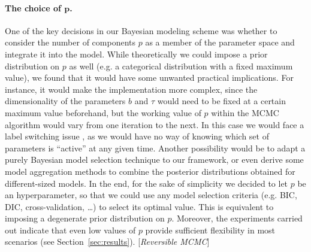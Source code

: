 \documentclass[ba]{imsart}
\numberwithin{equation}{section}
\theoremstyle{plain}
\newcommand\incomment[2][comment-red]{\color{#1}[\textit{#2}]\color{black}}
\begin{document}
\paragraph{The choice of \(\bm p\).} One of the key decisions in our Bayesian modeling scheme was whether to consider the number of components \(p\) as a member of the parameter space and integrate it into the model. While theoretically we could impose a prior distribution on \(p\) as well (e.g. a categorical distribution with a fixed maximum value), we found that it would have some unwanted practical implications. For instance, it would make the implementation more complex, since the dimensionality of the parameters \(b\) and \(\tau\) would need to be fixed at a certain maximum value beforehand, but the working value of \(p\) within the MCMC algorithm would vary from one iteration to the next. In this case we would face a label switching issue \citep[c.f.][Sec.~2.3]{grollemund2019bayesian}, as we would have no way of knowing which set of parameters is ``active'' at any given time. Another possibility would be to adapt a purely Bayesian model selection technique \citep[e.g.][Ch.~7]{piironen2017comparison, gelman2013bayesian} to our framework, or even derive some model aggregation methods to combine the posterior distributions obtained for different-sized models. In the end, for the sake of simplicity we decided to let \(p\) be an hyperparameter, so that we could use any model selection criteria (e.g. BIC, DIC, cross-validation, \ldots) to select its optimal value. This is equivalent to imposing a degenerate prior distribution on \(p\). Moreover, the experiments carried out indicate that even low values of \(p\) provide sufficient flexibility in most scenarios (see Section~\ref{sec:results}). \incomment{Reversible MCMC}
\end{document}
